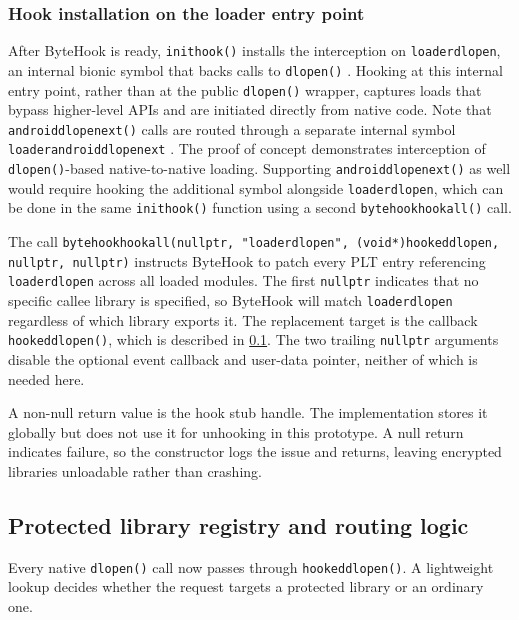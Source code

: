 \documentclass[11pt,a4paper]{report}
\renewcommand\_{{\textunderscore\allowbreak}}
\begin{document}
\subsubsection{Hook installation on the loader entry point}

After ByteHook is ready, \texttt{init\_hook()} installs the interception on \texttt{\_\_loader\_dlopen}, an internal bionic symbol that backs calls to \texttt{dlopen()} \cite{aosp_bionic_libdl}.  Hooking at this internal entry point, rather than at the public \texttt{dlopen()} wrapper, captures loads that bypass higher-level APIs and are initiated directly from native code.  Note that \texttt{android\_dlopen\_ext()} calls are routed through a separate internal symbol \texttt{\_\_loader\_android\_dlopen\_ext} \cite{aosp_bionic_libdl}.  The proof of concept demonstrates interception of \texttt{dlopen()}-based native-to-native loading. Supporting \texttt{android\_dlopen\_ext()} as well would require hooking the additional symbol alongside \texttt{\_\_loader\_dlopen}, which can be done in the same \texttt{init\_hook()} function using a second \texttt{bytehook\_hook\_all()} call.

The call \texttt{bytehook\_hook\_all(nullptr, "\_\_loader\_dlopen", (void*)hooked\_dlopen, nullptr, nullptr)} instructs ByteHook to patch every PLT entry referencing \texttt{\_\_loader\_dlopen} across all loaded modules.  The first \texttt{nullptr} indicates that no specific callee library is specified, so ByteHook will match \texttt{\_\_loader\_dlopen} regardless of which library exports it.  The replacement target is the callback \texttt{hooked\_dlopen()}, which is described in \cref{sec:routing}.  The two trailing \texttt{nullptr} arguments disable the optional event callback and user-data pointer, neither of which is needed here.

A non-null return value is the hook stub handle. The implementation stores it globally but does not use it for unhooking in this prototype.  A null return indicates failure, so the constructor logs the issue and returns, leaving encrypted libraries unloadable rather than crashing.

\subsection{Protected library registry and routing logic}
\label{sec:routing}

Every native \texttt{dlopen()} call now passes through \texttt{hooked\_dlopen()}.  A lightweight lookup decides whether the request targets a protected library or an ordinary one.
\end{document}
